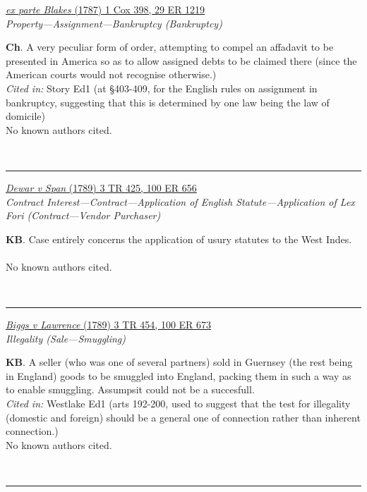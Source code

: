 \documentclass[twoside]{article}
\begin{document}
        \begin{small}
        \begin{center}
        \href{https://heinonline.org/HOL/P?h=hein.engrep/engrc0029&i=1227}{\textit{ex parte Blakes} (1787) 1 Cox 398, 29 ER 1219} \label{132} \\ 
\textit{Property---Assignment---Bankruptcy (Bankruptcy)}\\
        \end{center}
        \textbf{Ch}. A very peculiar form of order, attempting to compel an affadavit to be presented in America so as to allow assigned debts to be claimed there (since the American courts would not recognise otherwise.)\\\textit{Cited in: }Story Ed1 (at §403-409, for the English rules on assignment in bankruptcy, suggesting that this is determined by one law being the law of domicile)\\No known authors cited.
        \end{small}\\
        \rule{\textwidth}{0.5pt}
        

        \begin{small}
        \begin{center}
        \href{https://heinonline.org/HOL/P?h=hein.engrep/engrf0100&i=660}{\textit{Dewar v Span} (1789) 3 TR 425, 100 ER 656} \label{26} \\ 
\textit{Contract Interest---Contract---Application of English Statute---Application of Lex Fori (Contract---Vendor Purchaser)}\\
        \end{center}
        \textbf{KB}. Case entirely concerns the application of usury statutes to the West Indes.\\\\No known authors cited.
        \end{small}\\
        \rule{\textwidth}{0.5pt}
        

        \begin{small}
        \begin{center}
        \href{https://heinonline.org/HOL/P?h=hein.engrep/engrf0100&i=677}{\textit{Biggs v Lawrence} (1789) 3 TR 454, 100 ER 673} \label{70} \\ 
\textit{Illegality (Sale---Smuggling)}\\
        \end{center}
        \textbf{KB}. A seller (who was one of several partners) sold in Guernsey (the rest being in England) goods to be smuggled into England, packing them in such a way as to enable smuggling. Assumpsit could not be a succesfull.\\\textit{Cited in: }Westlake Ed1 (arts 192-200, used to suggest that the test for illegality (domestic and foreign) should be a general one of connection rather than inherent connection.)\\No known authors cited.
        \end{small}\\
        \rule{\textwidth}{0.5pt}
        
\end{document}
